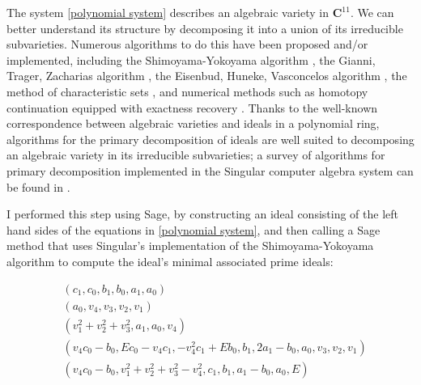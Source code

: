 \documentclass{article}
\begin{document}
The system \eqref{polynomial system} describes an algebraic variety in ${\mathbf C}^{11}$.
We can better understand its structure by decomposing it into a union
of its irreducible subvarieties.  Numerous algorithms to do this
have been proposed and/or implemented,
including the Shimoyama-Yokoyama algorithm \cite{SY},
the Gianni, Trager, Zacharias algorithm \cite{GTZ},
the Eisenbud, Huneke, Vasconcelos algorithm \cite{EHV},
the method of characteristic sets \cite{Ritt, Wu},
and numerical methods such as homotopy continuation equipped with exactness recovery \cite{Bertini}.
Thanks to the well-known correspondence between algebraic varieties and ideals in a polynomial ring,
algorithms for the primary decomposition of ideals are well suited to decomposing
an algebraic variety in its irreducible subvarieties;
a survey of algorithms for primary decomposition implemented in the Singular computer algebra system
can be found in \cite{Schönemann}.

I performed this step using Sage, by constructing an ideal consisting of the
left hand sides of the equations in \eqref{polynomial system}, and
then calling a Sage method that uses Singular's implementation of the Shimoyama-Yokoyama algorithm
to compute the ideal's minimal associated prime ideals:

\begin{subequations}
\label{ideal}
\begin{align}
& \left(c_{1}, c_{0}, b_{1}, b_{0}, a_{1}, a_{0}\right) \label{ideal:3} \\
& \left(a_{0}, v_{4}, v_{3}, v_{2}, v_{1}\right) \label{ideal:1} \\
& \left(v_{1}^{2} + v_{2}^{2} + v_{3}^{2}, a_{1}, a_{0}, v_{4}\right) \label{ideal:4} \\
& \left(v_{4} c_{0} - b_{0}, E c_{0} - v_{4} c_{1}, -v_{4}^{2} c_{1} + E b_{0}, b_{1}, 2 a_{1} - b_{0}, a_{0}, v_{3}, v_{2}, v_{1}\right) \label{ideal:2} \\
& \left(v_{4} c_{0} - b_{0}, v_{1}^{2} + v_{2}^{2} + v_{3}^{2} - v_{4}^{2}, c_{1}, b_{1}, a_{1} - b_{0}, a_{0}, E\right) \label{ideal:5}
\end{align}
\end{subequations}
\end{document}
